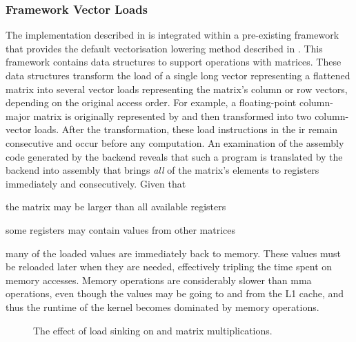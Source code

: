 \documentclass[\main/thesis.tex]{subfiles}
\begin{document}
\subsubsection{Framework Vector Loads}
The implementation described in  is integrated within a pre-existing framework that provides the default vectorisation lowering method described in .
This framework contains data structures to support operations with matrices.
These data structures transform the load of a single long vector representing a flattened matrix into several vector loads representing the matrix's column or row vectors, depending on the original access order.
For example, a floating-point column-major matrix  is originally represented by  and then transformed into two  column-vector loads.
After the transformation, these load instructions in the \gls{ir} remain consecutive and occur before any computation.
An examination of the assembly code generated by the backend reveals that such a program is translated by the backend into assembly that brings \emph{all} of the matrix's elements to registers immediately and consecutively.
Given that
\begin{enumerate*}[itemjoin={{; }}, itemjoin*={{; or }}, label=(\arabic*), after={,}]
  \item the matrix may be larger than all available registers
  \item some registers may contain values from other matrices
\end{enumerate*}
many of the loaded values are immediately  back to memory.
These values must be reloaded later when they are needed, effectively tripling the time spent on memory accesses.
Memory operations are considerably slower than \gls{mma} operations, even though the values may be going to and from the L1 cache, and thus the runtime of the kernel becomes dominated by memory operations.

\begin{figure}[t]
  \centering
  
  \caption{The effect of load sinking on  and  matrix multiplications.}
  \label{fig:floatSink}
\end{figure}
\end{document}
